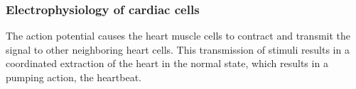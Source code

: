 \subsubsection{Electrophysiology of cardiac cells}
% 
The action potential causes the heart muscle cells to contract and transmit the signal to other neighboring heart cells. This transmission of stimuli results in a coordinated extraction of the heart in the normal state, which results in a pumping action, the heartbeat.





